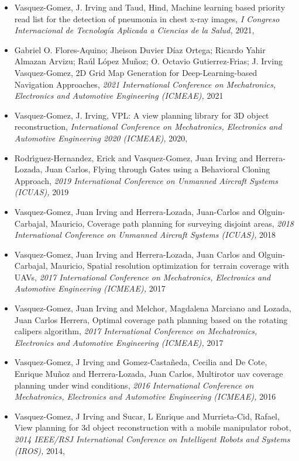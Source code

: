 \begin{itemize} 
\item Vasquez-Gomez, J. Irving and Taud, Hind, Machine learning based priority read list for the detection of pneumonia in chest x-ray images, \textit{ I Congreso Internacional de Tecnología Aplicada a Ciencias de la Salud,} 2021, \href{} {\faFilePdfO} 
\item Gabriel O. Flores-Aquino; Jheison Duvier Díaz Ortega; Ricardo Yahir Almazan Arvizu; Raúl López Muñoz; O. Octavio Gutierrez-Frias; J. Irving Vasquez-Gomez, 2D Grid Map Generation for Deep-Learning-based Navigation Approaches, \textit{ 2021 International Conference on Mechatronics, Electronics and Automotive Engineering (ICMEAE),} 2021 
\item Vasquez-Gomez, J. Irving, VPL: A view planning library for 3D object reconstruction, \textit{ International Conference on Mechatronics, Electronics and Automotive Engineering 2020 (ICMEAE),} 2020, \href{https://doi.org/10.1109/ICMEAE51770.2020.00010} {\faFilePdfO} 
\item Rodr{\'\i}guez-Hernandez, Erick and Vasquez-Gomez, Juan Irving and Herrera-Lozada, Juan Carlos, Flying through Gates using a Behavioral Cloning Approach, \textit{ 2019 International Conference on Unmanned Aircraft Systems (ICUAS),} 2019 
\item Vasquez-Gomez, Juan Irving and Herrera-Lozada, Juan-Carlos and Olguin-Carbajal, Mauricio, Coverage path planning for surveying disjoint areas, \textit{ 2018 International Conference on Unmanned Aircraft Systems (ICUAS),} 2018 
\item Vasquez-Gomez, Juan Irving and Herrera-Lozada, Juan Carlos and Olguin-Carbajal, Mauricio, Spatial resolution optimization for terrain coverage with UAVs, \textit{ 2017 International Conference on Mechatronics, Electronics and Automotive Engineering (ICMEAE),} 2017 
\item Vasquez-Gomez, Juan Irving and Melchor, Magdalena Marciano and Lozada, Juan Carlos Herrera, Optimal coverage path planning based on the rotating calipers algorithm, \textit{ 2017 International Conference on Mechatronics, Electronics and Automotive Engineering (ICMEAE),} 2017 
\item Vasquez-Gomez, J Irving and Gomez-Casta{\~n}eda, Cecilia and De Cote, Enrique Mu{\~n}oz and Herrera-Lozada, Juan Carlos, Multirotor uav coverage planning under wind conditions, \textit{ 2016 International Conference on Mechatronics, Electronics and Automotive Engineering (ICMEAE),} 2016 
\item Vasquez-Gomez, J Irving and Sucar, L Enrique and Murrieta-Cid, Rafael, View planning for 3d object reconstruction with a mobile manipulator robot, \textit{ 2014 IEEE/RSJ International Conference on Intelligent Robots and Systems (IROS),} 2014, \href{https://doi.org/10.1109/IROS.2014.6943158} {\faFilePdfO} 

\end{itemize}
